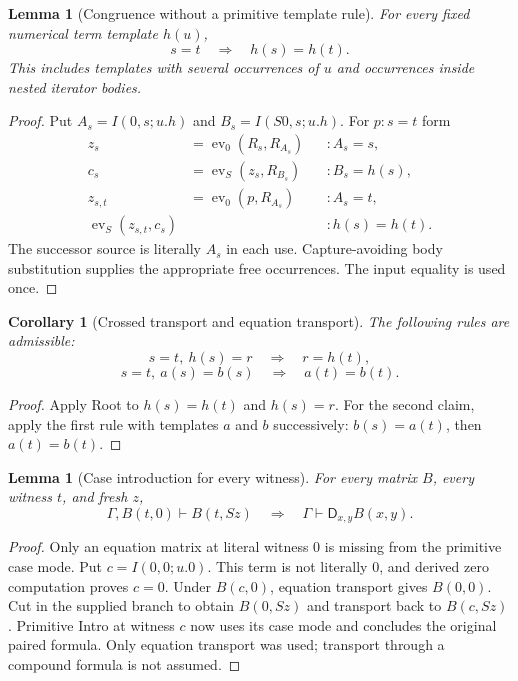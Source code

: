 \documentclass[11pt]{article}
\newtheorem{lemma}[theorem]{Lemma}
\newtheorem{corollary}[theorem]{Corollary}
\theoremstyle{definition}\newtheorem{definition}[theorem]{Definition}
\newcommand{\D}{\mathsf D}
\newcommand{\ev}{\operatorname{ev}}
\begin{document}
\begin{lemma}[Congruence without a primitive template rule]
For every fixed numerical term template $h(u)$,
\[
                   s=t\quad\Longrightarrow\quad h(s)=h(t).
\]
This includes templates with several occurrences of $u$ and
occurrences inside nested iterator bodies.
\end{lemma}
\begin{proof}
Put $A_s=I(0,s;u.h)$ and $B_s=I(S0,s;u.h)$. For $p:s=t$ form
\begin{align*}
 z_s&=\ev_0(R_s,R_{A_s}) &&:A_s=s,\\
 c_s&=\ev_S(z_s,R_{B_s}) &&:B_s=h(s),\\
 z_{s,t}&=\ev_0(p,R_{A_s}) &&:A_s=t,\\
 \ev_S(z_{s,t},c_s)&&&:h(s)=h(t).
\end{align*}
The successor source is literally $A_s$ in each use. Capture-avoiding
body substitution supplies the appropriate free occurrences. The
input equality is used once.
\end{proof}

\begin{corollary}[Crossed transport and equation transport]
The following rules are admissible:
\[
 s=t,\ h(s)=r\quad\Longrightarrow\quad r=h(t),
\]
\[
 s=t,\ a(s)=b(s)\quad\Longrightarrow\quad a(t)=b(t).
\]
\end{corollary}
\begin{proof}
Apply Root to $h(s)=h(t)$ and $h(s)=r$. For the second claim,
apply the first rule with templates $a$ and $b$ successively:
$b(s)=a(t)$, then $a(t)=b(t)$.
\end{proof}

\begin{lemma}[Case introduction for every witness]\label{lem:cases}
For every matrix $B$, every witness $t$, and fresh $z$,
\[
 \Gamma,B(t,0)\vdash B(t,Sz)
 \quad\Longrightarrow\quad
 \Gamma\vdash\D_{x,y}B(x,y).
\]
\end{lemma}
\begin{proof}
Only an equation matrix at literal witness $0$ is missing from the
primitive case mode. Put $c=I(0,0;u.0)$. This term is not literally
$0$, and derived zero computation proves $c=0$.
Under $B(c,0)$, equation transport gives $B(0,0)$. Cut in the
supplied branch to obtain $B(0,Sz)$ and transport back to
$B(c,Sz)$. Primitive Intro at witness $c$ now uses its case mode
and concludes the original paired formula. Only equation transport
was used; transport through a compound formula is not assumed.
\end{proof}
\end{document}

